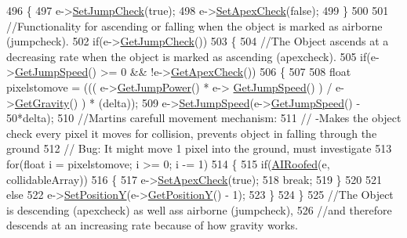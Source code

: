\begin{DoxyCode}
496     \{
497         e->\hyperlink{classAI_af70dcfec2f6f98c2113f416895c14214}{SetJumpCheck}(\textcolor{keyword}{true});
498         e->\hyperlink{classAI_acb9cc6624a01a27516f68406429f7496}{SetApexCheck}(\textcolor{keyword}{false});
499     \}
500 
501     \textcolor{comment}{//Functionality for ascending or falling when the object is marked as airborne (jumpcheck).}
502     \textcolor{keywordflow}{if}(e->\hyperlink{classAI_a44af0b44c634384d9aa5200b6e1b7427}{GetJumpCheck}())
503     \{
504         \textcolor{comment}{//The Object ascends at a decreasing rate when the object is marked as ascending (apexcheck).}
505         \textcolor{keywordflow}{if}(e->\hyperlink{classAI_a9d3a04adec2708eae25fa24af2eb23f7}{GetJumpSpeed}() >= 0 && !e->\hyperlink{classAI_ada8f2f0cbeef5ebaf251564d4e9b6510}{GetApexCheck}())
506         \{
507 
508             \textcolor{keywordtype}{float} pixelstomove = ((( e->\hyperlink{classAI_a92873a9908dc947bba6f7270765614a7}{GetJumpPower}() * e->
      \hyperlink{classAI_a9d3a04adec2708eae25fa24af2eb23f7}{GetJumpSpeed}() ) / e->\hyperlink{classAI_aaf2f8c7e9bf518bee620e5731faa1ed7}{GetGravity}() ) * (delta));
509             e->\hyperlink{classAI_a90247314e34a1d0e1376a27dac61f1c4}{SetJumpSpeed}(e->\hyperlink{classAI_a9d3a04adec2708eae25fa24af2eb23f7}{GetJumpSpeed}() - 50*delta);
510             \textcolor{comment}{//Martins carefull movement mechanism:}
511             \textcolor{comment}{//  -Makes the object check every pixel it moves for collision, prevents object in falling
       through the ground}
512             \textcolor{comment}{//  Bug: It might move 1 pixel into the ground, must investigate}
513             \textcolor{keywordflow}{for}(\textcolor{keywordtype}{float} i = pixelstomove; i >= 0; i -= 1)
514             \{
515                 \textcolor{keywordflow}{if}(\hyperlink{classPhysics_a1f8a402c1f90ffcbf0f4109c95c28991}{AIRoofed}(e, collidableArray))
516                 \{
517                     e->\hyperlink{classAI_acb9cc6624a01a27516f68406429f7496}{SetApexCheck}(\textcolor{keyword}{true});
518                     \textcolor{keywordflow}{break};
519                 \}
520 
521                 \textcolor{keywordflow}{else}
522                     e->\hyperlink{classAI_a4e042958bb678aebdee4af9925efa389}{SetPositionY}(e->\hyperlink{classAI_af234b480b8502f3dc1b1f3bac15e8b98}{GetPositionY}() - 1);
523             \}
524         \}
525             \textcolor{comment}{//The Object is descending (apexcheck) as well ass airborne (jumpcheck),}
526             \textcolor{comment}{//and therefore descends at an increasing rate because of how gravity works.}

\end{DoxyCode}
